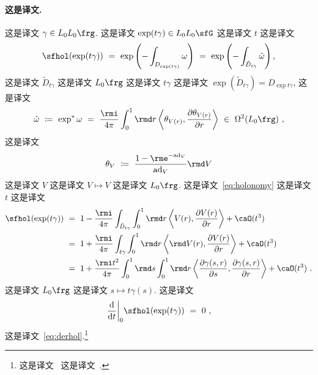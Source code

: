 \documentclass[
    affil-it, %
    auth-lg, %
    british, %
    compression, %
    contents, %
    custom-packages={}, %
    references={bigone}, %
]{lib/preprint}
\begin{document}
\begin{body}
        \paragraph{这是译文.}
 这是译文 $\gamma\in L_0L_0\frg$. 这是译文 $\exp(t\gamma)\in L_0L_0\sfG$ 这是译文 $t$ 这是译文         \begin{equation}\label{eq:holonomy}
            \sfhol(\exp(t\gamma))\ =\ \exp\left(-\int_{D_{\exp(t\gamma)}}\omega\right)\ =\ \exp\left(-\int_{\tilde D_{t\gamma}}\tilde\omega\right),
        \end{equation}  这是译文 $\tilde D_{t\gamma}$ 这是译文 $L_0\frg$ 这是译文 $t\gamma$ 这是译文 $\exp(\tilde D_{t\gamma})=D_{\exp t\gamma}$, 这是译文 
        \begin{equation}
            \tilde\omega\ \coloneqq\ \exp^*\omega\ =\ \frac{\rmi}{4\pi}\int_0^1\rmd r\innerLarge{\theta_{V(r)}}{\parder[\theta_{V(r)}]{r}}\ \in\ \Omega^2(L_0\frg)~,
        \end{equation}  这是译文         \begin{equation}
            \theta_V\ \coloneqq\ \frac{1-\rme^{-\ad_V}}{\ad_V}\rmd V
        \end{equation}  这是译文 $V$ 这是译文 $V\mapsto V$ 这是译文 $L_0\frg$. 这是译文~\eqref{eq:holonomy} 这是译文 $t$ 这是译文         \begin{equation}
            \begin{aligned}
                \sfhol(\exp(t\gamma))\ &=\ 1-\frac{\rmi}{4\pi}\int_{\tilde D_{t\gamma}}\int_0^1\rmd r\innerLarge{V(r)}{\parder[V(r)]{r}}+\caO(t^3)
                \\
                &=\ 1+\frac{\rmi}{4\pi}\int_{t\gamma}\int_0^1\rmd r\innerLarge{\rmd V(r)}{\parder[V(r)]{r}}+\caO(t^3)
                \\
                &=\ 1+\frac{\rmi t^2}{4\pi}\int_0^1\rmd s\int_0^1\rmd r\innerLarge{\parder[\gamma(s,r)]{s}}{\parder[\gamma(s,r)]{r}}+\caO(t^3)~.
            \end{aligned} 
        \end{equation}  这是译文 $L_0\frg$ 这是译文 $s\mapsto t\gamma(s) $. 这是译文         \begin{equation}\label{eq:holder}
            \dder{t}\bigg|_0\sfhol(\exp(t\gamma))\ =\ 0~,
        \end{equation}  这是译文~\eqref{eq:derhol}.\footnote{这是译文~\cite{Mackaay:2000ac} 这是译文~\cite{Barrett:1991aj}.}
        

\end{body}
\end{document}
